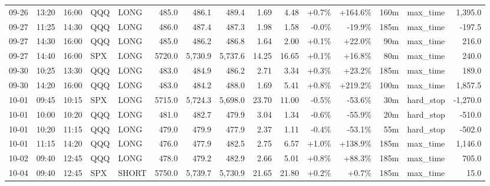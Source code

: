 \documentclass[11pt,a4paper,twoside]{article}
\begin{document}
\begin{landscape}
\begin{center}
\begin{longtable}{>{\color{txtmain}}l l l l l r r r r r r r r >{\color{txtmain}}l r}
09-26 & 13:20 & 16:00 & QQQ & LONG & 485.0 & 486.1 & 489.4 & 1.69 & 4.48 & \textcolor{wingreen}{+0.7\%} & \textcolor{wingreen}{+164.6\%} & 160m & max\_time & \textcolor{wingreen}{1,395.0} \\
09-27 & 11:25 & 14:30 & QQQ & LONG & 486.0 & 487.4 & 487.3 & 1.98 & 1.58 & \textcolor{lossred}{-0.0\%} & \textcolor{lossred}{-19.9\%} & 185m & max\_time & \textcolor{lossred}{-197.5} \\
09-27 & 14:30 & 16:00 & QQQ & LONG & 485.0 & 486.2 & 486.8 & 1.64 & 2.00 & \textcolor{wingreen}{+0.1\%} & \textcolor{wingreen}{+22.0\%} & 90m & max\_time & \textcolor{wingreen}{216.0} \\
09-27 & 14:40 & 16:00 & SPX & LONG & 5720.0 & 5,730.9 & 5,737.6 & 14.25 & 16.65 & \textcolor{wingreen}{+0.1\%} & \textcolor{wingreen}{+16.8\%} & 80m & max\_time & \textcolor{wingreen}{240.0} \\
09-30 & 10:25 & 13:30 & QQQ & LONG & 483.0 & 484.9 & 486.2 & 2.71 & 3.34 & \textcolor{wingreen}{+0.3\%} & \textcolor{wingreen}{+23.2\%} & 185m & max\_time & \textcolor{wingreen}{189.0} \\
09-30 & 14:20 & 16:00 & QQQ & LONG & 483.0 & 484.2 & 488.0 & 1.69 & 5.41 & \textcolor{wingreen}{+0.8\%} & \textcolor{wingreen}{+219.2\%} & 100m & max\_time & \textcolor{wingreen}{1,857.5} \\
10-01 & 09:45 & 10:15 & SPX & LONG & 5715.0 & 5,724.3 & 5,698.0 & 23.70 & 11.00 & \textcolor{lossred}{-0.5\%} & \textcolor{lossred}{-53.6\%} & 30m & hard\_stop & \textcolor{lossred}{-1,270.0} \\
10-01 & 10:00 & 10:20 & QQQ & LONG & 481.0 & 482.7 & 479.9 & 3.04 & 1.34 & \textcolor{lossred}{-0.6\%} & \textcolor{lossred}{-55.9\%} & 20m & hard\_stop & \textcolor{lossred}{-510.0} \\
10-01 & 10:20 & 11:15 & QQQ & LONG & 479.0 & 479.9 & 477.9 & 2.37 & 1.11 & \textcolor{lossred}{-0.4\%} & \textcolor{lossred}{-53.1\%} & 55m & hard\_stop & \textcolor{lossred}{-502.0} \\
10-01 & 11:15 & 14:20 & QQQ & LONG & 476.0 & 477.9 & 482.5 & 2.75 & 6.57 & \textcolor{wingreen}{+1.0\%} & \textcolor{wingreen}{+138.9\%} & 185m & max\_time & \textcolor{wingreen}{1,146.0} \\
10-02 & 09:40 & 12:45 & QQQ & LONG & 478.0 & 479.2 & 482.9 & 2.66 & 5.01 & \textcolor{wingreen}{+0.8\%} & \textcolor{wingreen}{+88.3\%} & 185m & max\_time & \textcolor{wingreen}{705.0} \\
10-04 & 09:40 & 12:45 & SPX & SHORT & 5750.0 & 5,739.7 & 5,730.9 & 21.65 & 21.80 & \textcolor{wingreen}{+0.2\%} & \textcolor{wingreen}{+0.7\%} & 185m & max\_time & \textcolor{wingreen}{15.0} \\

\end{longtable}
\end{center}
\end{landscape}
\end{document}
